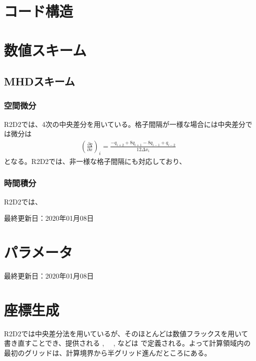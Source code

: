 \documentclass[letterpaper,10pt,dvipdfmx,report]{sphinxmanual}
\begin{document}
\chapter{コード構造}
\label{\detokenize{code:id1}}\label{\detokenize{code::doc}}

\chapter{数値スキーム}
\label{\detokenize{scheme:id1}}\label{\detokenize{scheme::doc}}

\section{MHDスキーム}
\label{\detokenize{scheme:mhd}}

\subsection{空間微分}
\label{\detokenize{scheme:id2}}
R2D2では、4次の中央差分を用いている。格子間隔が一様な場合には中央差分では微分は
\begin{equation*}
\begin{split}\left(\frac{\partial q}{\partial x}\right)_i =\frac{-q_{i+2}+8q_{i+1}-8q_{i-1}+q_{i-2}}{12\Delta x_i}\end{split}
\end{equation*}
となる。R2D2では、非一様な格子間隔にも対応しており、


\subsection{時間積分}
\label{\detokenize{scheme:id3}}
R2D2では、

最終更新日：2020年01月08日


\chapter{パラメータ}
\label{\detokenize{parameter:id1}}\label{\detokenize{parameter::doc}}
最終更新日：2020年01月08日


\chapter{座標生成}
\label{\detokenize{geometry:id1}}\label{\detokenize{geometry::doc}}
R2D2では中央差分法を用いているが、そのほとんどは数値フラックスを用いて書き直すことでき、提供される  , 　,  などは  で定義される。よって計算領域内の最初のグリッドは、計算境界から半グリッド進んだところにある。
\end{document}
